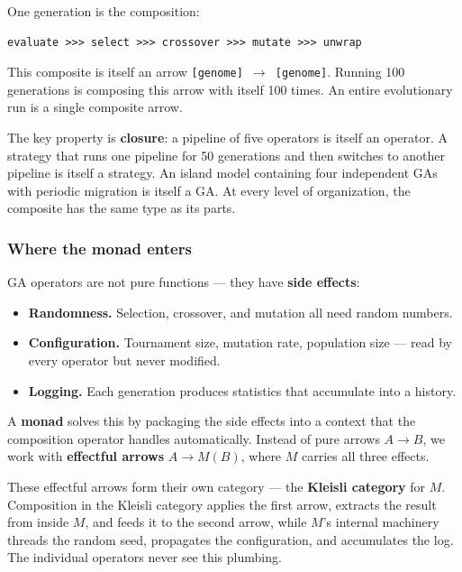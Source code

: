 \documentclass[10pt]{article}
\begin{document}
One generation is the composition:

\begin{lstlisting}[style=plainstyle]
evaluate >>> select >>> crossover >>> mutate >>> unwrap
\end{lstlisting}

This composite is itself an arrow \texttt{[genome] $\to$ [genome]}. Running 100 generations is composing this arrow with itself 100 times. An entire evolutionary run is a single composite arrow.

The key property is \textbf{closure}: a pipeline of five operators is itself an operator. A strategy that runs one pipeline for 50 generations and then switches to another pipeline is itself a strategy. An island model containing four independent GAs with periodic migration is itself a GA. At every level of organization, the composite has the same type as its parts.

\subsubsection*{Where the monad enters}

GA operators are not pure functions --- they have \textbf{side effects}:

\begin{itemize}
  \item \textbf{Randomness.} Selection, crossover, and mutation all need random numbers.
  \item \textbf{Configuration.} Tournament size, mutation rate, population size --- read by every operator but never modified.
  \item \textbf{Logging.} Each generation produces statistics that accumulate into a history.
\end{itemize}

A \textbf{monad} solves this by packaging the side effects into a context that the composition operator handles automatically. Instead of pure arrows $A \to B$, we work with \textbf{effectful arrows} $A \to M(B)$, where $M$ carries all three effects.

These effectful arrows form their own category --- the \textbf{Kleisli category} for $M$. Composition in the Kleisli category applies the first arrow, extracts the result from inside $M$, and feeds it to the second arrow, while $M$'s internal machinery threads the random seed, propagates the configuration, and accumulates the log. The individual operators never see this plumbing.
\end{document}
